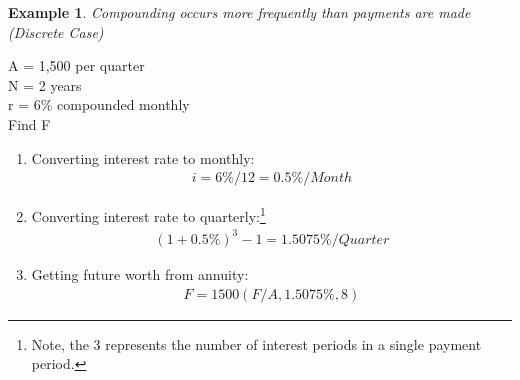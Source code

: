 \documentclass{report} %
\newtheorem{exmp}{Example}
\begin{document}
\begin{exmp}
    Compounding occurs more frequently than payments are made (Discrete Case)
\end{exmp}
\begin{center}
    A = 1,500 per quarter \\
    N = 2 years \\ 
    r = 6\% compounded monthly \\
    Find F
\end{center}
\begin{enumerate}
    \item Converting interest rate to monthly:
    \begin{equation*}
        \begin{aligned}
            i = 6\%/12 = 0.5\%/Month
        \end{aligned}
    \end{equation*}
    \item Converting interest rate to quarterly:\footnote{Note, the 3 represents the number of interest periods in a single payment period.}
    \begin{equation*}
        \begin{aligned}
            (1 + 0.5\%)^3 - 1 = 1.5075\%/Quarter
        \end{aligned}
    \end{equation*}
    \item Getting future worth from annuity:
    \begin{equation*}
        \begin{aligned}
            F = 1500(F/A,1.5075\%,8)
        \end{aligned}
    \end{equation*} 
\end{enumerate}
\end{document}
